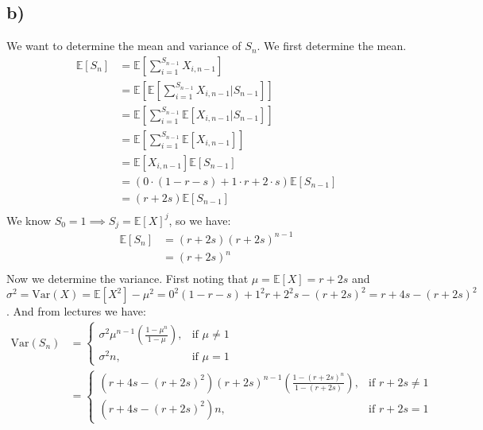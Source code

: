 \documentclass{article}
\begin{document}
\subsection*{b)}
We want to determine the mean and variance of $S_n$. We first determine the mean.
\begin{align*}
\mathbb{E}[S_n]&=\mathbb{E}\left[\sum_{i=1}^{S_{n-1}}X_{i,n-1}\right]\\
&=\mathbb{E}\left[\mathbb{E}\left[\sum_{i=1}^{S_{n-1}}X_{i,n-1}|S_{n-1}\right]\right]\\
&=\mathbb{E}\left[\sum_{i=1}^{S_{n-1}}\mathbb{E}\left[X_{i,n-1}|S_{n-1}\right]\right]\\
&=\mathbb{E}\left[\sum_{i=1}^{S_{n-1}}\mathbb{E}\left[X_{i,n-1}\right]\right]\\
&=\mathbb{E}[X_{i,n-1}]\mathbb{E}[S_{n-1}]\\
&=(0\cdot(1-r-s)+1\cdot r+2\cdot s)\mathbb{E}[S_{n-1}]\\
&=(r+2s)\mathbb{E}[S_{n-1}]\\
\end{align*}
We know $S_0=1\implies S_j=\mathbb{E}[X]^j$, so we have:
\begin{align*}
\mathbb{E}[S_n]&=(r+2s)(r+2s)^{n-1}\\
&=(r+2s)^n\\
\end{align*}
Now we determine the variance. First noting that $\mu=\mathbb{E}[X]=r+2s$ and  $\sigma^2=\text{Var}(X)=\mathbb{E}[X^2]-\mu^2=0^2(1-r-s)+1^2r+2^2s-(r+2s)^2=r+4s-(r+2s)^2$. And from lectures we have:
\begin{align*}
\text{Var}(S_n)&=\begin{cases}\sigma^2\mu^{n-1}\left(\frac{1-\mu^n}{1-\mu}\right), & \text{if } \mu\neq1\\\sigma^2 n, & \text{if } \mu=1\end{cases}\\
&=\begin{cases}(r+4s-(r+2s)^2)(r+2s)^{n-1}\left(\frac{1-(r+2s)^n}{1-(r+2s)}\right), & \text{if } r+2s\neq1\\(r+4s-(r+2s)^2) n, & \text{if } r+2s=1\end{cases}\\
\end{align*}
\end{document}
